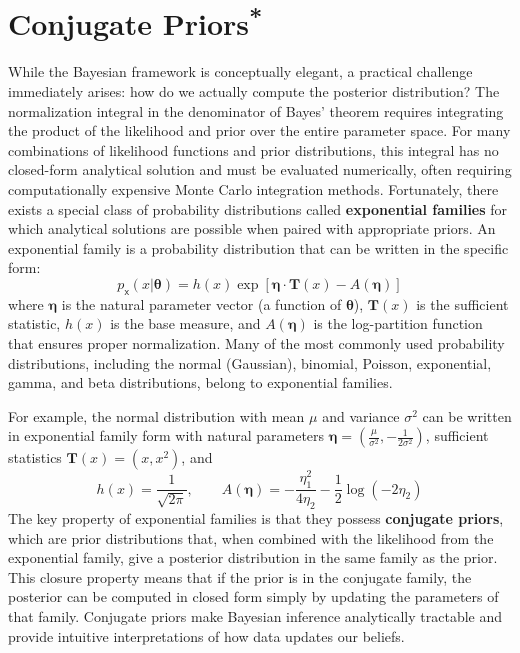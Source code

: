 \section{\texorpdfstring{Conjugate Priors\textsuperscript{*}}{Conjugate Priors}}

While the Bayesian framework is conceptually elegant, a practical challenge immediately arises: how do we actually compute the posterior distribution? The normalization integral in the denominator of Bayes' theorem requires integrating the product of the likelihood and prior over the entire parameter space. For many combinations of likelihood functions and prior distributions, this integral has no closed-form analytical solution and must be evaluated numerically, often requiring computationally expensive Monte Carlo integration methods. Fortunately, there exists a special class of probability distributions called \textbf{exponential families} for which analytical solutions are possible when paired with appropriate priors. An exponential family is a probability distribution that can be written in the specific form:
\begin{equation}
    p_{\mathsf{x}}(x|\boldsymbol{\theta}) = h(x) \exp\left[\boldsymbol{\eta} \cdot \mathbf{T}(x) - A(\boldsymbol{\eta})\right]
\end{equation}
where $\boldsymbol{\eta}$ is the natural parameter vector (a function of $\boldsymbol{\theta}$), $\mathbf{T}(x)$ is the sufficient statistic, $h(x)$ is the base measure, and $A(\boldsymbol{\eta})$ is the log-partition function that ensures proper normalization. Many of the most commonly used probability distributions, including the normal (Gaussian), binomial, Poisson, exponential, gamma, and beta distributions, belong to exponential families.

For example, the normal distribution with mean $\mu$ and variance $\sigma^2$ can be written in exponential family form with natural parameters $\boldsymbol{\eta} = \left(\frac{\mu}{\sigma^2}, -\frac{1}{2\sigma^2}\right)$, sufficient statistics $\mathbf{T}(x) = (x, x^2)$, and
\begin{equation}
    h(x) = \frac{1}{\sqrt{2\pi}}, \qquad A(\boldsymbol{\eta}) = -\frac{\eta_1^2}{4\eta_2} - \frac{1}{2}\log(-2\eta_2)
\end{equation}
The key property of exponential families is that they possess \textbf{conjugate priors}, which are prior distributions that, when combined with the likelihood from the exponential family, give a posterior distribution in the same family as the prior. This closure property means that if the prior is in the conjugate family, the posterior can be computed in closed form simply by updating the parameters of that family. Conjugate priors make Bayesian inference analytically tractable and provide intuitive interpretations of how data updates our beliefs.

